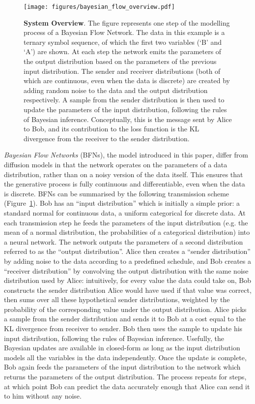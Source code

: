\documentclass[11pt,table]{article}
\newcommand{\0}[1]{\constvec{0}{#1}}
\newcommand{\1}[1]{\constvec{1}{#1}}
\begin{document}
\begin{figure}[t!] 
    \texttt{[image: figures/bayesian\_flow\_overview.pdf]}
\caption{\textbf{System Overview}. The figure represents one step of the modelling process of a Bayesian Flow Network. The data in this example is a ternary symbol sequence, of which the first two variables (`B' and `A') are shown.  At each step the network emits the parameters of the output distribution based on the parameters of the previous input distribution.  The sender and receiver distributions (both of which are continuous, even when the data is discrete) are created by adding random noise to the data and the output distribution respectively.  A sample from the sender distribution is then used to update the parameters of the input distribution, following the rules of Bayesian inference. Conceptually, this is the message sent by Alice to Bob, and its contribution to the loss function is the KL divergence from the receiver to the sender distribution.}
\label{fig:overview}
\end{figure}

\emph{Bayesian Flow Networks} (BFNs), the model introduced in this paper, differ from diffusion models in that the network operates on the parameters of a data distribution, rather than on a noisy version of the data itself.
This ensures that the generative process is fully continuous and differentiable, even when the data is discrete.
BFNs can be summarised by the following transmission scheme (Figure~\ref{fig:overview}).
Bob has an ``input distribution'' which is initially a simple prior: a standard normal for continuous data, a uniform categorical for discrete data.
At each transmission step he feeds the parameters of the input distribution (e.g. the mean of a normal distribution, the probabilities of a categorical distribution) into a neural network.
The network outputs the parameters of a second distribution referred to as the ``output distribution''.
Alice then creates a ``sender distribution'' by adding noise to the data according to a predefined schedule, and Bob creates a ``receiver distribution'' by convolving the output distribution with the same noise distribution used by Alice: intuitively, for every value the data could take on, Bob constructs the sender distribution Alice would have used if that value was correct, then sums over all these hypothetical sender distributions, weighted by the probability of the corresponding value under the output distribution.
Alice picks a sample from the sender distribution and sends it to Bob at a cost equal to the KL divergence from receiver to sender.
Bob then uses the sample to update his input distribution, following the rules of Bayesian inference.
Usefully, the Bayesian updates are available in closed-form as long as the input distribution models all the variables in the data independently.
Once the update is complete, Bob again feeds the parameters of the input distribution to the network which returns the parameters of the output distribution.
The process repeats for  steps, at which point Bob can predict the data accurately enough that Alice can send it to him without any noise.
\end{document}
